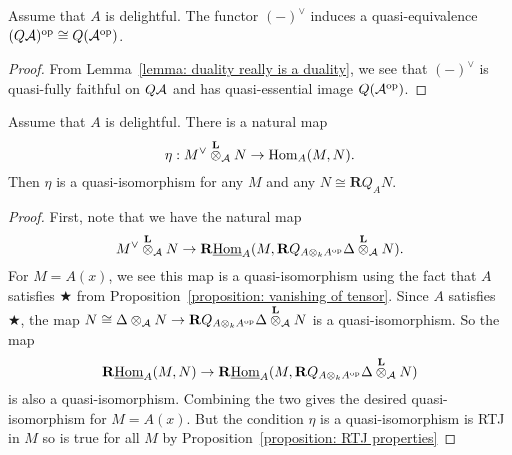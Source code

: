 \begin{corollary} \label{corollary: duality is a duality}
  Assume that \(A\) is delightful. The functor \((-)^\vee\) induces a quasi-equivalence \((Q\mathcal{A})^{\operatorname{op}} \cong Q(\mathcal{A}^{\operatorname{op}})\). 
\end{corollary}

\begin{proof}
  From Lemma~\ref{lemma: duality really is a duality}, we see that \((-)^\vee\) is quasi-fully faithful on \(Q\mathcal{A}\) and has quasi-essential image \(Q(\mathcal{A}^{\operatorname{op}})\). 
\end{proof}

\begin{lemma} \label{lemma: trace map}
  Assume that \(A\) is delightful. There is a natural map 
  \begin{displaymath}
    \eta : M^\vee \overset{\mathbf{L}}{\otimes}_{\mathcal A} N \to \operatorname{Hom}_A(M,N).
  \end{displaymath}
  Then \(\eta\) is a quasi-isomorphism for any \(M\) and any \(N \cong \mathbf{R}Q_A N\). 
\end{lemma}

\begin{proof}
  First, note that we have the natural map 
  \begin{displaymath}
    M^\vee \overset{\mathbf{L}}{\otimes}_{\mathcal A} N \to \mathbf{R}\underline{\operatorname{Hom}}_A(M, \mathbf{R}Q_{A \otimes_k A^{\operatorname{op}}} \Delta \overset{\mathbf{L}}{\otimes}_{\mathcal A} N).
  \end{displaymath}
  For \(M = A(x)\), we see this map is a quasi-isomorphism using the fact that \(A\) satisfies \(\bigstar\) from Proposition~\ref{proposition: vanishing of tensor}. 
  Since \(A\) satisfies \(\bigstar\), the map \(N \cong \Delta \otimes_{\mathcal A} N \to \mathbf{R}Q_{A \otimes_k A^{\operatorname{op}}} \Delta \overset{\mathbf{L}}{\otimes}_{\mathcal A} N\) is a quasi-isomorphism. So the map  
  \begin{displaymath}
    \mathbf{R}\underline{\operatorname{Hom}}_A(M, N) \to \mathbf{R}\underline{\operatorname{Hom}}_A(M, \mathbf{R}Q_{A \otimes_k A^{\operatorname{op}}} \Delta \overset{\mathbf{L}}{\otimes}_{\mathcal A} N)
  \end{displaymath}
  is also a quasi-isomorphism. Combining the two gives the desired quasi-isomorphism for \(M = A(x)\). But the condition \(\eta\) is a quasi-isomorphism is RTJ in \(M\) so is true for all \(M\) by Proposition~\ref{proposition: RTJ properties}
\end{proof}

